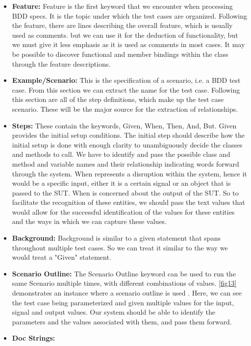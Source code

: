 \documentclass[conference, onecolumn, a4, 12pt]{IEEEtran}
\begin{document}
\begin{itemize}
	\item \textbf{Feature:}
	Feature is the first keyword that we encounter when processing BDD specs. It is the topic under which the test cases are organized. Following the feature, there are lines describing the overall feature, which is usually used as comments. but we can use it for the deduction of functionality, but we must give it less emphasis as it is used as comments in most cases. It may be possible to discover functional and member bindings within the class through the feature descriptions.
	\item \textbf{Example/Scenario:}  
	This is the specification of a scenario, i.e. a BDD test case. From this section we can extract the name for the test case. Following this section are all of the step definitions, which make up the test case scenario. These will be the major source for the extraction of relationships.
	\item \textbf{Steps:}
	These contain the keywords, Given, When, Then, And, But. Given provides the initial setup conditions. The initial step should describe how the initial setup is done with enough clarity to unambiguously decide the classes and methods to call. We have to identify and pass the possible class and method and variable names and their relationship indicating words forward through the system. When represents a disruption within the system, hence it would be a specific input, either it is a certain signal or an object that is passed to the SUT. When is concerned about the output of the SUT. So to facilitate the recognition of these entities, we should pass the text values that would allow for the successful identification of the values for these entities and the ways in which we can capture these values.
	\item \textbf{Background:}
	Background is similar to a given statement that spans throughout multiple test cases. So we can treat it similar to the way we would treat a "Given" statement.
	\item \textbf{Scenario Outline:}
	The Scenario Outline keyword can be used to run the same Scenario multiple times, with different combinations of values. \ref{fig13} demonstrates an instance where a scenario outline is used \cite{a1}. Here, we can see the test case being parameterized and given multiple values for the input, signal and output values. Our system should be able to identify the parameters and the values associated with them, and pass them forward.
	\item \textbf{Doc Strings:}

\end{itemize}
\end{document}
